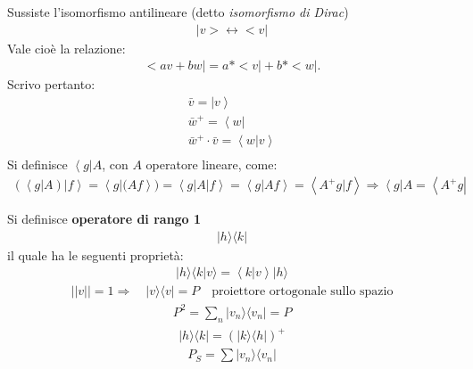 Sussiste l'isomorfismo antilineare (detto \textit{isomorfismo di Dirac})
\begin{equation}\begin{split}
|v> \longleftrightarrow <v|
\end{split}\end{equation}
Vale cioè la relazione:
\begin{equation}\begin{split}
<av+bw|=a*<v|+b*<w|.
\end{split}\end{equation}
Scrivo pertanto:
\begin{equation}\begin{split}
\bar v=\left |v \right\rangle \\
\bar w^+=\left\langle w \right | \\
\bar w^+\cdot \bar v=\left\langle w|v \right\rangle \\
\end{split}\end{equation}
Si definisce $\left\langle g \right | A$, con $A$ operatore lineare, come:
\begin{equation}\begin{split}
\left(\left\langle g \right | A \right)\left | f \right \rangle = \left\langle g | (Af\right\rangle)=\left\langle g|A|f \right\rangle=\left\langle g|Af \right\rangle=\left\langle A^+g|f \right\rangle \Longrightarrow 
\left\langle g\right |A=\left\langle A^+g\right |
\end{split}\end{equation}

Si definisce \textbf{operatore di rango 1} 
\begin{equation}\begin{split}
|h\rangle\langle k|
\end{split}\end{equation} il quale ha le seguenti proprietà:
\begin{equation}\begin{split}
|h\rangle\langle k| v\rangle = \left\langle k|v \right\rangle |h\rangle 
\end{split}\end{equation}
\begin{equation}\begin{split}
||v||=1 \Longrightarrow \quad |v\rangle\langle v|=P \quad \textrm{proiettore ortogonale sullo spazio}
\end{split}\end{equation}
\begin{equation}\begin{split}
P^2=\sum_{n}|v_n\rangle\langle v_n|=P
\end{split}\end{equation}
\begin{equation}\begin{split}
|h\rangle\langle k|=\left(|k\rangle\langle h|\right)^+ 
\end{split}\end{equation}
\begin{equation}\begin{split}
P_S=\sum |v_n\rangle\langle v_n|
\end{split}\end{equation}

